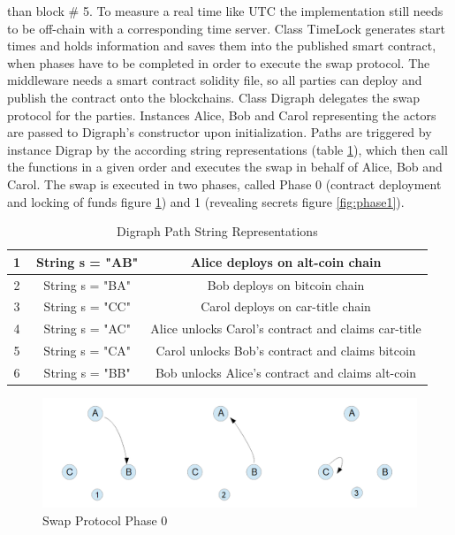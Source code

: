 than block \# 5. To measure a real time like \ac{UTC} the implementation still needs to be off-chain with a corresponding time server. Class TimeLock generates start times and holds information and saves them into the published smart contract, when phases have to be completed in order to execute the swap protocol. The middleware needs a smart contract solidity file, so all parties can deploy and publish the contract onto the blockchains. Class Digraph delegates the swap protocol for the parties. Instances Alice, Bob and Carol representing the actors are passed to Digraph's constructor upon initialization. Paths are triggered by instance Digrap by the according string representations (table \ref{table:2}), which then call the functions in a given order and executes the swap in behalf of Alice, Bob and Carol. The swap is executed in two phases, called Phase 0 (contract deployment and locking of funds figure \ref{fig:phase0}) and 1 (revealing secrets figure \ref{fig:phase1}). \newline

\begin{table}[h!]
	\centering
	\begin{tabular}{|c | c | c |} 
		\hline 
		\textcircled{1} & String s = "AB" & Alice deploys on alt-coin chain\\ [0.5ex] 
		\hline
		\textcircled{2} & String s = "BA" & Bob deploys on bitcoin chain\\ 
		\hline
		\textcircled{3} & String s = "CC" & Carol deploys on car-title chain \\
		\hline
		\textcircled{4} & String s = "AC" & Alice unlocks Carol's contract and claims car-title \\ [1ex] 
		\hline
		\textcircled{5} & String s = "CA" & Carol unlocks Bob's contract and claims bitcoin \\ [1ex] 
		\hline
		\textcircled{6} & String s = "BB" & Bob unlocks Alice's contract and claims alt-coin \\ [1ex] 
		\hline
	\end{tabular}
	\caption{Digraph Path String Representations}
	\label{table:2}
\end{table}

\begin{figure}[h]
	\includegraphics[width=0.7\paperwidth]{phase0}	
	\caption{Swap Protocol Phase 0}
	\label{fig:phase0}
\end{figure}

